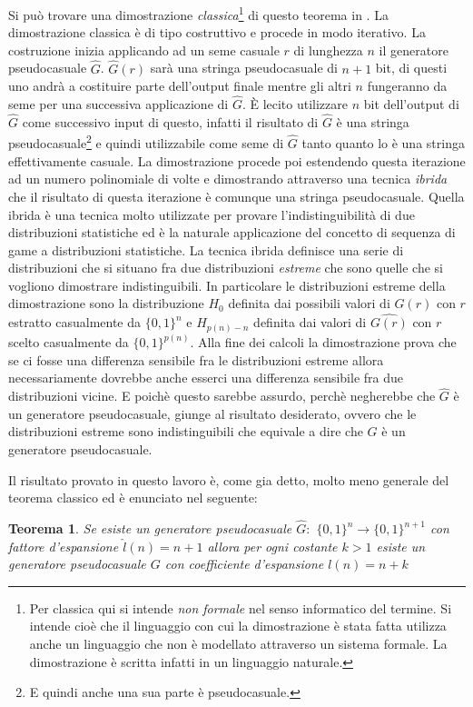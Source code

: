 \documentclass[a4paper,openright,twoside,12pt]{report}
\newtheorem{teorema}{Teorema}[chapter]
\begin{document}
Si pu\`o trovare una dimostrazione \emph{classica}\footnote{Per classica qui si intende \emph{non formale} nel senso informatico del termine.
Si intende cio\`e che il linguaggio con cui la dimostrazione \`e stata fatta utilizza anche un linguaggio che non \`e modellato
attraverso un sistema formale. La dimostrazione \`e scritta infatti in un linguaggio naturale.} di questo teorema in \cite{1206501}. 
La dimostrazione classica \`e di tipo costruttivo e procede in modo iterativo.
La costruzione inizia applicando ad un seme casuale $r$ di lunghezza $n$ il generatore pseudocasuale $\hat{G}$. 
$\hat{G}(r)$ sar\`a una stringa pseudocasuale di $n+1$ bit, di questi uno andr\`a a costituire parte dell'output finale mentre gli altri 
$n$ fungeranno da seme per una successiva applicazione di $\hat{G}$. 
\`E lecito utilizzare $n$ bit dell'output di $\hat{G}$ come successivo input di questo, infatti il risultato di $\hat{G}$ \`e 
una stringa pseudocasuale\footnote{E quindi anche una sua parte \`e pseudocasuale.} e quindi utilizzabile come seme di $\hat{G}$ tanto quanto 
lo \`e una stringa effettivamente casuale.
La dimostrazione procede poi estendendo questa iterazione ad un numero polinomiale di volte e dimostrando attraverso una tecnica \emph{ibrida}
che il risultato di questa iterazione \`e comunque una stringa pseudocasuale. Quella ibrida \`e una tecnica molto utilizzate per provare l'indistinguibilit\`a di due distribuzioni statistiche ed \`e 
la naturale applicazione del concetto di sequenza di game a distribuzioni statistiche.
La tecnica ibrida definisce una serie di distribuzioni che si situano fra due distribuzioni \emph{estreme} che sono quelle che si vogliono dimostrare indistinguibili.
In particolare le distribuzioni estreme della dimostrazione sono la distribuzione $H_0$ definita dai possibili valori di $G(r)$ con $r$ estratto casualmente da $\{0,1\}^n$ e 
$H_{p(n)-n}$ definita dai valori di $\hat{G(r)}$ con $r$ scelto
casualmente da $\{0, 1\}^{p(n)}$. 
Alla fine dei calcoli la dimostrazione prova che se ci fosse una differenza sensibile fra le distribuzioni estreme allora necessariamente dovrebbe anche esserci una differenza
sensibile fra due distribuzioni vicine. E poich\`e questo sarebbe assurdo, perch\`e negherebbe che $\hat{G}$ \`e un generatore pseudocasuale, giunge al risultato desiderato, ovvero che
le distribuzioni estreme sono indistinguibili che equivale a dire che $G$ \`e un generatore pseudocasuale.


Il risultato provato in questo lavoro \`e, come gia detto, molto meno generale del teorema classico ed \`e enunciato nel seguente:
\begin{teorema}
Se esiste un generatore pseudocasuale $\hat{G}:$ $\{0, 1\}^n \rightarrow \{0, 1\}^{n+1}$ 
con fattore d'espansione $\hat{l}(n)=n+1$ allora per ogni costante $k > 1$ esiste un generatore 
pseudocasuale $G$ con coefficiente d'espansione $l(n)=n+k$
\end{teorema}
\end{document}
